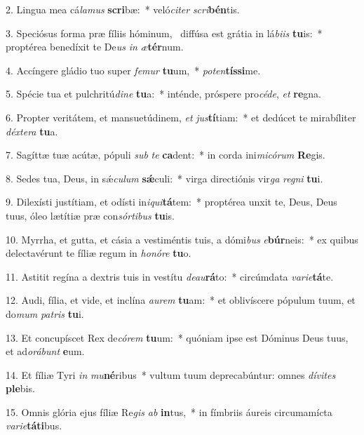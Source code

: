 2. Lingua mea cá\textit{la}\textit{mus} \textbf{scri}bæ:~*  veló\textit{ci}\textit{ter} \textit{scri}\textbf{bén}tis.\

3. Speciósus forma præ fíliis hóminum, \dag\  diffúsa est grátia in lá\textit{bi}\textit{is} \textbf{tu}is:~*  proptérea benedíxit te De\textit{us} \textit{in} \textit{æ}\textbf{tér}num.\

4. Accíngere gládio tuo super \textit{fe}\textit{mur} \textbf{tu}um,~*  \textit{pot}\textit{en}\textbf{tís}\textbf{si}me.\

5. Spécie tua et pulchritú\textit{di}\textit{ne} \textbf{tu}a:~*  inténde, próspere pro\textit{cé}\textit{de}, \textit{et} \textbf{re}gna.\

6. Propter veritátem, et mansuetúdinem, \textit{et} \textit{jus}\textbf{tí}tiam:~*  et dedúcet te mirabíliter \textit{déx}\textit{te}\textit{ra} \textbf{tu}a.\

7. Sagíttæ tuæ acútæ, pópuli \textit{sub} \textit{te} \textbf{ca}dent:~*  in corda ini\textit{mi}\textit{có}\textit{rum} \textbf{Re}gis.\

8. Sedes tua, Deus, in sǽ\textit{cu}\textit{lum} \textbf{sǽ}culi:~*  virga directiónis vir\textit{ga} \textit{re}\textit{gni} \textbf{tu}i.\

9. Dilexísti justítiam, et odísti in\textit{i}\textit{qui}\textbf{tá}tem:~*  proptérea unxit te, Deus, Deus tuus, óleo lætítiæ præ con\textit{sór}\textit{ti}\textit{bus} \textbf{tu}is.\

10. Myrrha, et gutta, et cásia a vestiméntis tuis, a dómi\textit{bus} \textit{e}\textbf{búr}neis:~*  ex quibus delectavérunt te fíliæ regum in \textit{ho}\textit{nó}\textit{re} \textbf{tu}o.\

11. Astitit regína a dextris tuis in vestítu \textit{de}\textit{au}\textbf{rá}to:~*  circúmdata \textit{va}\textit{ri}\textit{e}\textbf{tá}te.\

12. Audi, fília, et vide, et inclína \textit{au}\textit{rem} \textbf{tu}am:~*  et oblivíscere pópulum tuum, et do\textit{mum} \textit{pa}\textit{tris} \textbf{tu}i.\

13. Et concupíscet Rex de\textit{có}\textit{rem} \textbf{tu}um:~*  quóniam ipse est Dóminus Deus tuus, et ad\textit{o}\textit{rá}\textit{bunt} \textbf{e}um.\

14. Et fíliæ Tyri \textit{in} \textit{mu}\textbf{né}ribus~*  vultum tuum deprecabúntur: omnes \textit{dí}\textit{vi}\textit{tes} \textbf{ple}bis.\

15. Omnis glória ejus fíliæ Re\textit{gis} \textit{ab} \textbf{in}tus,~*  in fímbriis áureis circumamícta \textit{va}\textit{ri}\textit{e}\textbf{tá}\textbf{ti}bus.\

